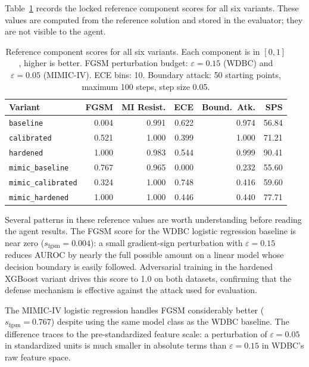 \documentclass[11pt]{article}
\begin{document}
Table~\ref{tab:components} records the locked reference component scores for
all six variants. These values are computed from the reference solution and
stored in the evaluator; they are not visible to the agent.

\begin{table}[t]
\caption{Reference component scores for all six variants. Each component is
in $[0, 1]$, higher is better. FGSM perturbation budget: $\varepsilon = 0.15$
(WDBC) and $\varepsilon = 0.05$ (MIMIC-IV). ECE bins: 10. Boundary attack:
50 starting points, maximum 100 steps, step size 0.05.}
\label{tab:components}
\vskip 0.1in
\centering
\small
\begin{tabular}{@{}lrrrrr@{}}
\toprule
\textbf{Variant} & \textbf{FGSM} & \textbf{MI Resist.}
  & \textbf{ECE} & \textbf{Bound.\ Atk.} & \textbf{SPS} \\
\midrule
\texttt{baseline}          & 0.004 & 0.991 & 0.622 & 0.974 & 56.84 \\
\texttt{calibrated}        & 0.521 & 1.000 & 0.399 & 1.000 & 71.21 \\
\texttt{hardened}          & 1.000 & 0.983 & 0.544 & 0.999 & 90.41 \\
\texttt{mimic\_baseline}   & 0.767 & 0.965 & 0.000 & 0.232 & 55.60 \\
\texttt{mimic\_calibrated} & 0.324 & 1.000 & 0.748 & 0.416 & 59.60 \\
\texttt{mimic\_hardened}   & 1.000 & 1.000 & 0.446 & 0.440 & 77.71 \\
\bottomrule
\end{tabular}
\end{table}

Several patterns in these reference values are worth understanding before
reading the agent results. The FGSM score for the WDBC logistic regression
baseline is near zero ($s_{\text{fgsm}} = 0.004$): a small gradient-sign
perturbation with $\varepsilon = 0.15$ reduces AUROC by nearly the full
possible amount on a linear model whose decision boundary is easily followed.
Adversarial training in the hardened XGBoost variant drives this score to 1.0
on both datasets, confirming that the defense mechanism is effective against
the attack used for evaluation.

The MIMIC-IV logistic regression handles FGSM considerably better
($s_{\text{fgsm}} = 0.767$) despite using the same model class as the WDBC
baseline. The difference traces to the pre-standardized feature scale: a
perturbation of $\varepsilon = 0.05$ in standardized units is much smaller in
absolute terms than $\varepsilon = 0.15$ in WDBC's raw feature space.
\end{document}

